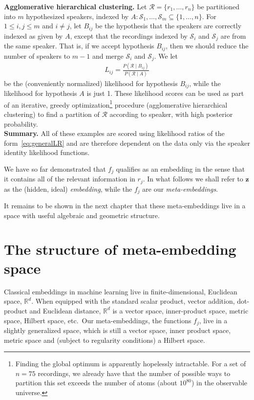 \documentclass[a4paper,oneside,12pt,english]{report}
\def\zvec{\mathbf{z}}
\def\R{\mathbb{R}}
\def\Rset{\mathcal{R}}
\def\Sset{\mathcal{S}}
\begin{document}
\noindent\textbf{Agglomerative hierarchical clustering.} Let $\Rset=\{r_1,\ldots,r_n\}$ be partitioned into $m$ hypothesized speakers, indexed by $A:\Sset_1,\ldots,\Sset_m\subseteq\{1,\ldots,n\}$. For $1\le i,j\le m$ and $i\ne j$, let $B_{ij}$ be the hypothesis that the speakers are correctly indexed as given by $A$, except that the recordings indexed by $\Sset_i$ and $\Sset_j$ are from the same speaker. That is, if we accept hypothesis $B_{ij}$, then we should reduce the number of speakers to $m-1$ and merge $\Sset_i$ and $\Sset_j$. We let 
\begin{align}
\label{eq:LR_AHC}
L_{ij}=\frac{P(\Rset\mid B_{ij})}{P(\Rset\mid A)}
\end{align}
be the (conveniently normalized) likelihood for hypothesis $B_{ij}$,  while the likelihood for hypothesis $A$ is just 1. These likelihood scores can be used as part of an iterative, greedy optimization\footnote{Finding the global optimum is apparently hopelessly intractable. For a set of $n=75$ recordings, we already have that the number of possible ways to partition this set exceeds the number of atoms (about $10^{80}$) in the observable universe.} procedure (agglomerative hierarchical clustering) to find a partition of $\Rset$ according to speaker, with high posterior probability. \\


\noindent
\textbf{Summary.} All of these examples are scored using likelihood ratios of the form~\eqref{eq:generalLR} and are therefore dependent on the data only via the speaker identity likelihood functions. 

We have so far demonstrated that $f_j$ qualifies as an embedding in the sense that it contains all of the relevant information in $r_j$. In what follows we shall refer to $\zvec$ as the (hidden, ideal) \emph{embedding}, while the $f_j$ are our \emph{meta-embeddings}. 

It remains to be shown in the next chapter that these meta-embeddings live in a space with useful algebraic and geometric structure.
	
	
\chapter{The structure of meta-embedding space}
Classical embeddings in machine learning live in finite-dimensional, Euclidean space, $\R^d$. When equipped with the standard scalar product, vector addition, dot-product and Euclidean distance, $\R^d$ is a vector space, inner-product space, metric space, Hilbert space, etc.\ Our meta-embeddings, the functions $f_j$, live in a slightly generalized space, which is still a vector space, inner product space, metric space and (subject to regularity conditions) a Hilbert space. 
\end{document}
